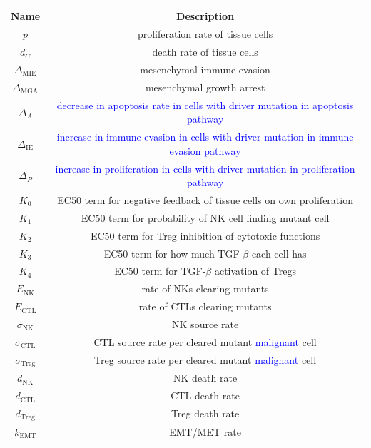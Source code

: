 \documentclass[11pt]{article}
\newcommand{\tcb} { \textcolor{blue} }
\begin{document}
\begin{table}[H]
\begin{center}
 \begin{tabular}{|| c | c ||} 
 \hline
 {\bf Name} & {\bf Description}  \\ [0.5ex] 
 \hline
 $p$ & proliferation rate of tissue cells \\ 
 \hline
 $d_C$  & death rate of tissue cells \\
 \hline
$\Delta_\text{MIE}$ &  mesenchymal immune evasion \\
 \hline
 $\Delta_\text{MGA}$ & mesenchymal growth arrest    \\
 \hline
  $\Delta_A$ & \tcb{decrease in apoptosis rate in cells with driver mutation in apoptosis pathway}  \\ 
    \hline
  $\Delta_\text{IE}$ & \tcb{increase in immune evasion in cells with driver mutation in immune evasion pathway} \\
  \hline
  $\Delta_P$ & \tcb{increase in proliferation in cells with driver mutation in proliferation pathway}\\
  \hline
 $K_0$ & EC50 term for negative feedback of tissue cells on own proliferation\\
 \hline
 $K_1$ & EC50 term for probability of NK cell finding mutant cell\\
 \hline
  $K_2$ & EC50 term for Treg inhibition of cytotoxic functions  \\
  \hline
  $K_3$ & EC50 term for how much TGF-$\beta$ each cell has \\
  \hline
  $K_4$ & EC50 term for TGF-$\beta$ activation of Tregs \\
  \hline
 $E_\text{NK}$ & rate of NKs clearing mutants  \\
  \hline
  $E_\text{CTL}$ & rate of CTLs clearing mutants \\
  \hline
  $\sigma_\text{NK}$ & NK source rate \\ 
  \hline
  $\sigma_\text{CTL}$ & CTL source rate per cleared \sout{mutant} \tcb{malignant} cell \\ 
  \hline
  $\sigma_\text{Treg}$ & Treg source rate per cleared \sout{mutant} \tcb{malignant} cell \\ 
  \hline
  $d_\text{NK}$ & NK death rate \\ 
  \hline
  $d_\text{CTL}$ & CTL death rate \\ 
  \hline
  $d_\text{Treg}$ & Treg death rate \\ 
  \hline
  $k_\text{EMT}$ & EMT/MET rate  \\

\end{tabular}
\end{center}
\end{table}
\end{document}
